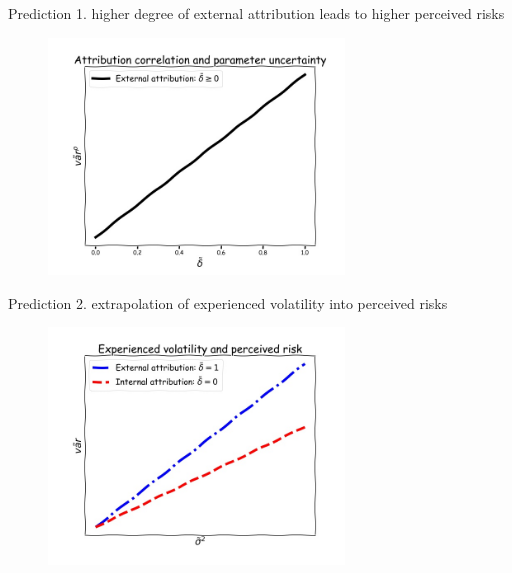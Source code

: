 \documentclass{beamer}
\begin{document}
\begin{frame}{Prediction 1. higher degree of external attribution leads to higher perceived risks}
	\begin{figure}
		\centering 
		\label{var_experience_var}
		\includegraphics[width=0.7\textwidth]{figures/corr_var.jpg}
	\end{figure}
\end{frame}


\begin{frame}{Prediction 2. extrapolation of experienced volatility into perceived risks}
	\begin{figure}
		\centering 
		\label{var_experience_var}
		\includegraphics[width=0.7\textwidth]{figures/var_experience_var.jpg}
	\end{figure}
\end{frame}
\end{document}
